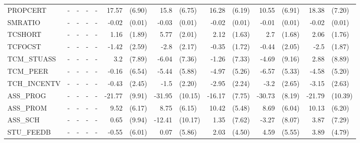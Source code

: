 \documentclass[10pt]{article}
\begin{document}
\begin{table}[htbp]
\begin{tabular}{lrlrlrlrlrlrlrl}
    PROPCERT & \multicolumn{1}{c}{-} & \multicolumn{1}{c}{-} & \multicolumn{1}{c}{-} & \multicolumn{1}{c}{-} & 17.57 & (6.90) & 15.8  & (6.75) & 16.28 & (6.19) & 10.55 & (6.91) & 18.38 & (7.20) \\
    SMRATIO & \multicolumn{1}{c}{-} & \multicolumn{1}{c}{-} & \multicolumn{1}{c}{-} & \multicolumn{1}{c}{-} & -0.02 & (0.01) & -0.03 & (0.01) & -0.02 & (0.01) & -0.01 & (0.01) & -0.02 & (0.01) \\
    TCSHORT & \multicolumn{1}{c}{-} & \multicolumn{1}{c}{-} & \multicolumn{1}{c}{-} & \multicolumn{1}{c}{-} & 1.16  & (1.89) & 5.77  & (2.01) & 2.12  & (1.63) & 2.7   & (1.68) & 2.06  & (1.76) \\
    TCFOCST & \multicolumn{1}{c}{-} & \multicolumn{1}{c}{-} & \multicolumn{1}{c}{-} & \multicolumn{1}{c}{-} & -1.42 & (2.59) & -2.8  & (2.17) & -0.35 & (1.72) & -0.44 & (2.05) & -2.5  & (1.87) \\
    TCM\_STUASS & \multicolumn{1}{c}{-} & \multicolumn{1}{c}{-} & \multicolumn{1}{c}{-} & \multicolumn{1}{c}{-} & 3.2   & (7.89) & -6.04 & (7.36) & -1.26 & (7.33) & -4.69 & (9.16) & 2.88  & (8.89) \\
    TCM\_PEER & \multicolumn{1}{c}{-} & \multicolumn{1}{c}{-} & \multicolumn{1}{c}{-} & \multicolumn{1}{c}{-} & -0.16 & (6.54) & -5.44 & (5.88) & -4.97 & (5.26) & -6.57 & (5.33) & -4.58 & (5.20) \\
    TCH\_INCENTV & \multicolumn{1}{c}{-} & \multicolumn{1}{c}{-} & \multicolumn{1}{c}{-} & \multicolumn{1}{c}{-} & -0.43 & (2.45) & -1.5  & (2.20) & -2.95 & (2.24) & -3.2  & (2.65) & -3.15 & (2.63) \\
    ASS\_PROG & \multicolumn{1}{c}{-} & \multicolumn{1}{c}{-} & \multicolumn{1}{c}{-} & \multicolumn{1}{c}{-} & -21.77 & (9.91) & -31.95 & (10.15) & -16.17 & (7.75) & -30.73 & (8.19) & -21.79 & (10.39) \\
    ASS\_PROM & \multicolumn{1}{c}{-} & \multicolumn{1}{c}{-} & \multicolumn{1}{c}{-} & \multicolumn{1}{c}{-} & 9.52  & (6.17) & 8.75  & (6.15) & 10.42 & (5.48) & 8.69  & (6.04) & 10.13 & (6.20) \\
    ASS\_SCH & \multicolumn{1}{c}{-} & \multicolumn{1}{c}{-} & \multicolumn{1}{c}{-} & \multicolumn{1}{c}{-} & 0.65  & (9.94) & -12.41 & (10.17) & 1.35  & (7.62) & -3.27 & (8.07) & 3.87  & (7.29) \\
    STU\_FEEDB & \multicolumn{1}{c}{-} & \multicolumn{1}{c}{-} & \multicolumn{1}{c}{-} & \multicolumn{1}{c}{-} & -0.55 & (6.01) & 0.07  & (5.86) & 2.03  & (4.50) & 4.59  & (5.55) & 3.89  & (4.79) \\

\end{tabular}
\end{table}
\end{document}
